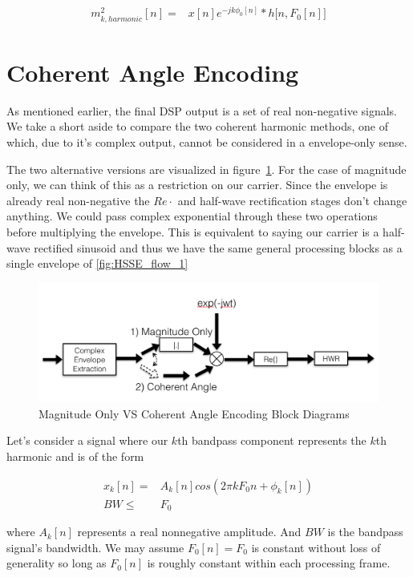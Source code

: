 \documentclass [11pt, proquest,oneside] {uwthesis}[2015/03/03]
\begin{document}
\begin{align}
m^2_{k,harmonic}[n] =& x[n] e^{-jk\phi_0 [n]} * h\big[n, F_0[n] \big]
\end{align}

\section{Coherent Angle Encoding}

As mentioned earlier, the final DSP output is a set of real non-negative signals.  We take a short aside to compare the two coherent harmonic methods, one of which, due to it's complex output, cannot be considered in a envelope-only sense.

The two alternative versions are visualized in figure~\ref{fig:coherent_angle}.  For the case of magnitude only, we can think of this as a restriction on our carrier.  Since the envelope is already real non-negative the $Re{\cdot}$ and half-wave rectification stages don't change anything.  We could pass complex exponential through these two operations before multiplying the envelope.  This is equivalent to saying our carrier is a half-wave rectified sinusoid and thus we have the same general processing blocks as a single envelope of \ref{fig:HSSE_flow_1}

\begin{figure}[!ht]
  \centering
    \includegraphics[width=1\textwidth]{coherent_angle}   
    \caption{Magnitude Only VS Coherent Angle Encoding Block Diagrams}
    \label{fig:coherent_angle}
\end{figure}

Let's consider a signal where our $k$th bandpass component represents the $k$th harmonic and is of the form

\begin{align}
x_k[n] =& A_k[n]cos(2\pi kF_0n + \phi_k[n]) \\
BW \leq& F_0 \nonumber
\end{align}

where $A_k[n]$ represents a real nonnegative amplitude.  And $BW$ is the bandpass signal's bandwidth.  We may assume $F_0[n] = F_0$ is constant without loss of generality so long as $F_0[n]$ is roughly constant within each processing frame.
\end{document}
